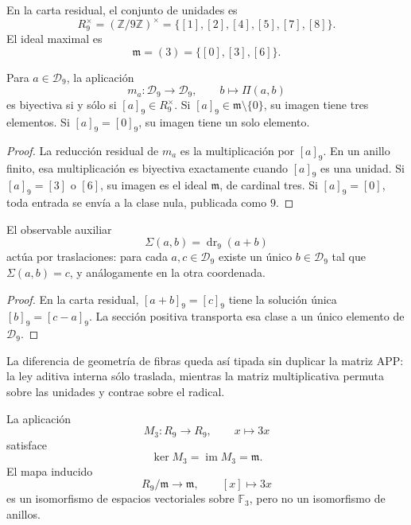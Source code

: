 En la carta residual, el conjunto de unidades es
\[
 R_9^\times=(\mathbb Z/9\mathbb Z)^\times
   =\{[1],[2],[4],[5],[7],[8]\}.
\]
El ideal maximal es
\[
 \mathfrak m=(3)=\{[0],[3],[6]\}.
\]

\begin{theorem}
\label{p12-83-c1-s1:thm:app-clasificacion-filas-producto}
Para \(a\in\mathcal D_9\), la aplicación
\[
 m_a:\mathcal D_9\longrightarrow\mathcal D_9,
 \qquad b\longmapsto\Pi(a,b)
\]
es biyectiva si y sólo si \([a]_9\in R_9^\times\). Si
\([a]_9\in\mathfrak m\setminus\{0\}\), su imagen tiene tres elementos. Si
\([a]_9=[0]_9\), su imagen tiene un solo elemento.
\end{theorem}

\begin{proof}
La reducción residual de \(m_a\) es la multiplicación por \([a]_9\). En un
anillo finito, esa multiplicación es biyectiva exactamente cuando \([a]_9\)
es una unidad. Si \([a]_9=[3]\) o \([6]\), su imagen es el ideal
\(\mathfrak m\), de cardinal tres. Si \([a]_9=[0]\), toda entrada se envía
a la clase nula, publicada como \(9\).
\end{proof}

\begin{proposition}
\label{p12-83-c1-s1:prop:app-latinidad-aditiva}
El observable auxiliar
\[
 \Sigma(a,b)=\operatorname{dr}_9(a+b)
\]
actúa por traslaciones: para cada \(a,c\in\mathcal D_9\) existe un único
\(b\in\mathcal D_9\) tal que \(\Sigma(a,b)=c\), y análogamente en la otra
coordenada.
\end{proposition}

\begin{proof}
En la carta residual, \([a+b]_9=[c]_9\) tiene la solución única
\([b]_9=[c-a]_9\). La sección positiva transporta esa clase a un único
elemento de \(\mathcal D_9\).
\end{proof}

La diferencia de geometría de fibras queda así tipada sin duplicar la matriz
APP: la ley aditiva interna sólo traslada, mientras la matriz multiplicativa
permuta sobre las unidades y contrae sobre el radical.

\begin{proposition}
\label{p12-83-c1-s1:prop:app-radical-lineal}
La aplicación
\[
 M_3:R_9\longrightarrow R_9,
 \qquad x\longmapsto3x
\]
satisface
\[
 \ker M_3=\operatorname{im}M_3=\mathfrak m.
\]
El mapa inducido
\[
 R_9/\mathfrak m\longrightarrow\mathfrak m,
 \qquad [x]\longmapsto3x
\]
es un isomorfismo de espacios vectoriales sobre \(\mathbb F_3\), pero no un
isomorfismo de anillos.
\end{proposition}


